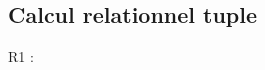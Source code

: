 \documentclass[a4paper,12pt]{article}
\begin{document}
\subsection{Calcul relationnel tuple}
\begin{list}{-}{}
  \item R1 :


\end{list}
\end{document}
